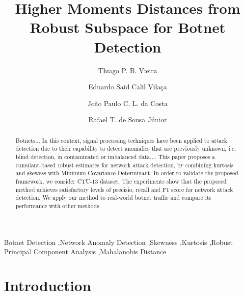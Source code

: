 \documentclass[review]{elsarticle}
\begin{document}
\begin{frontmatter}

\title{Higher Moments Distances from Robust Subspace for Botnet Detection}

\author[unbaddress]{Thiago P. B. Vieira}
\author[unbaddress]{Eduardo Said Calil Vilaça}
\author[unbaddress,Ilmenauaddress,Fraunhoferaddress]{João Paulo C. L. da Costa}
\author[unbaddress]{Rafael T. de Sousa Júnior}

\address[unbaddress]{Department of Electrical Engineering, University of Brasilia (UnB), 70910-900, Brasília-DF, Brazil}
\address[Ilmenauaddress]{Institute for Information Technology, Ilmenau University of Technology, Ilmenau, Germany}
\address[Fraunhoferaddress]{Fraunhofer Institute for Integrated Circuits IIS, Erlangen, Germany}


\begin{abstract}
Botnets... In this context, signal processing techniques have been applied to attack detection due to their capability to detect anomalies that are previously unknown, i.e. blind detection, in contaminated or imbalanced data.... This paper proposes a cumulant-based robust estimates for network attack detection, by combining kurtosis and skewess with Minimum Covariance Determinant. In order to validate the proposed framework, we consider CTU-13 dataset. The experiments show that the proposed method achieves satisfactory levels of precisio, recall and F1 score for network attack detection. We apply our method to real-world botnet traffic and compare its performance with other methods.
\end{abstract}

\begin{keyword}
Botnet Detection \sep Network Anomaly Detection \sep Skewness \sep Kurtosis \sep Robust Principal Component Analysis \sep Mahalanobis Distance
\end{keyword}

\end{frontmatter}

\linenumbers

\section{Introduction}
\label{sec:introduction}
\end{document}
